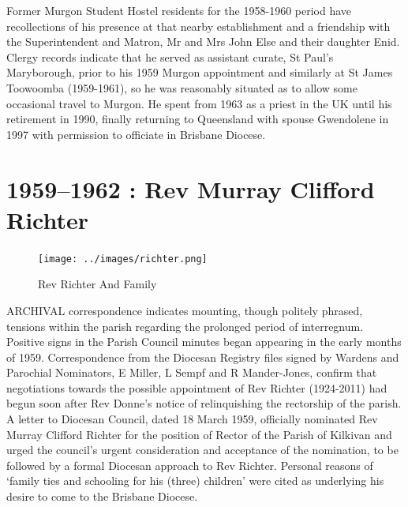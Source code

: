 Former Murgon Student Hostel residents for the 1958-1960 period have recollections of his presence at that nearby establishment and a friendship with the Superintendent and Matron, Mr and Mrs John Else and their daughter Enid. Clergy records indicate that he served as assistant curate, St Paul's Maryborough, prior to his 1959 Murgon appointment and similarly at St James Toowoomba (1959-1961), so he was reasonably situated as to allow some occasional travel to Murgon. He spent from 1963 as a priest in the UK until his retirement in 1990, finally returning to Queensland with spouse Gwendolene in 1997 with permission to officiate in Brisbane Diocese.



\balance


\printendnotes[custom]
\setcounter{endnote}{0}
\chapter{1959--1962 : Rev Murray Clifford Richter}
\nobalance








\begin{figure}
\begin{center}
\texttt{[image: ../images/richter.png]}
\caption{Rev Richter And Family}
\end{center}
\end{figure}




\lettrine[lines=3]{A}{RCHIVAL}
 correspondence indicates mounting, though politely phrased, tensions within the parish regarding the prolonged period of interregnum. Positive signs in the Parish Council minutes began appearing in the early months of 1959. Correspondence from the Diocesan Registry files signed by Wardens and Parochial Nominators, E Miller, L Sempf and R Mander-Jones, confirm that negotiations towards the possible appointment of Rev Richter (1924-2011) had begun soon after Rev Donne's notice of relinquishing the rectorship of the parish. A letter to Diocesan Council, dated 18 March 1959, officially nominated Rev Murray Clifford Richter for the position of Rector of the Parish of Kilkivan and urged the council's urgent consideration and acceptance of the nomination, to be followed by a formal Diocesan approach to Rev Richter. Personal reasons of `family ties and schooling for his (three) children' were cited as underlying his desire to come to the Brisbane Diocese.

